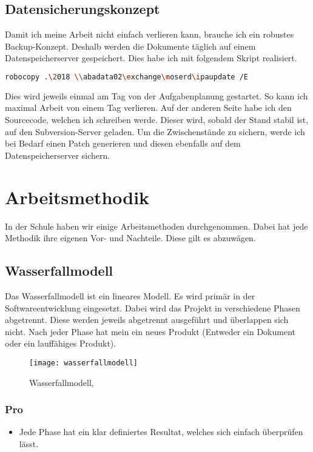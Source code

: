 \subsection{Datensicherungskonzept}
Damit ich meine Arbeit nicht einfach verlieren kann, brauche ich ein robustes Backup-Konzept. Deshalb werden die Dokumente täglich auf einem Datenspeicherserver gespeichert. Dies habe ich mit folgendem Skript realisiert.
\begin{lstlisting}[language=bash]
robocopy .\2018 \\abadata02\exchange\moserd\ipaupdate /E
\end{lstlisting}
Dies wird jeweils einmal am Tag von der Aufgabenplanung gestartet. So kann ich maximal Arbeit von einem Tag verlieren. Auf der anderen Seite habe ich den Sourcecode, welchen ich schreiben werde. Dieser wird, sobald der Stand stabil ist, auf den Subversion-Server geladen. Um die Zwischenstände zu sichern, werde ich bei Bedarf einen Patch generieren und diesen ebenfalls auf dem Datenspeicherserver sichern.

\section{Arbeitsmethodik} \label{Arbeitsmethodik}
In der Schule haben wir einige Arbeitsmethoden durchgenommen. Dabei hat jede Methodik ihre eigenen Vor- und Nachteile. Diese gilt es abzuwägen. 
\subsection{Wasserfallmodell}
Das Wasserfallmodell ist ein lineares Modell. Es wird primär in der Softwareentwicklung eingesetzt. Dabei wird das Projekt in verschiedene Phasen abgetrennt. Diese werden jeweils abgetrennt ausgeführt und überlappen sich nicht. Nach jeder Phase hat mein ein neues Produkt (Entweder ein Dokument oder ein lauffähiges Produkt).
\begin{figure}[H]
	\centering
	\texttt{[image: wasserfallmodell]}
	\caption{Wasserfallmodell, \cite{wiki:Wasserfallmodellimage}}
\end{figure}
\subsubsection{Pro}
\begin{itemize}
\item Jede Phase hat ein klar definiertes Resultat, welches sich einfach überprüfen lässt.
\end{itemize}
